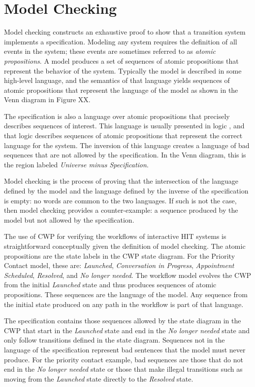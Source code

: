 \section{Model Checking}

Model checking constructs an exhaustive proof to show that a transition system implements a specification. Modeling any system requires the definition of all events in the system; these events are sometimes referred to as \emph{atomic propositions}. A model produces a set of sequences of atomic propositions that represent the behavior of the system. Typically the model is described in some high-level language, and the semantics of that language yields sequences of atomic propositions that represent the language of the model as shown in the Venn diagram in Figure XX.

The specification is also a language over atomic propositions that precisely describes sequences of interest. This language is usually presented in logic \cite{LTL, CTL}, and that logic describes sequences of atomic propositions that represent the correct language for the system. The inversion of this language creates a language of bad sequences that are not allowed by the specification. In the Venn diagram, this is the region labeled \emph{Universe minus Specification}.

Model checking is the process of proving that the intersection of the language defined by the model and the language defined by the inverse of the specification is empty: no words are common to the two languages. If such is not the case, then model checking provides a counter-example: a sequence produced by the model but not allowed by the specification.

The use of CWP for verifying the workflows of interactive HIT systems is straightforward conceptually given the definition of model checking. The atomic propositions are the state labels in the CWP state diagram. For the Priority Contact model, these are: \emph{Launched}, \emph{Conversation in Progress}, \emph{Appointment Scheduled}, \emph{Resolved}, and \emph{No longer needed}. The workflow model evolves the CWP from the initial \emph{Launched} state and thus produces sequences of atomic propositions. These sequences are the language of the model. Any sequence from the initial state produced on any path in the workflow is part of that language.

The specification contains those sequences allowed by the state diagram in the CWP that start in the \emph{Launched} state and end in the \emph{No longer needed} state and only follow transitions defined in the state diagram. Sequences not in the language of the specification represent bad sentences that the model must never produce. For the priority contact example, bad sequences are those that do not end in the \emph{No longer needed} state or those that make illegal transitions such as moving from the \emph{Launched} state directly to the \emph{Resolved} state.


